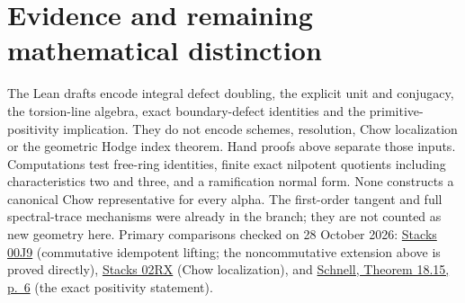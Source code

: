 \documentclass[11pt]{article}
\begin{document}
\section{Evidence and remaining mathematical distinction}
The Lean drafts encode integral defect doubling, the explicit unit and
conjugacy, the torsion-line algebra, exact boundary-defect identities and
the primitive-positivity implication. They do not encode schemes, resolution,
Chow localization or the geometric Hodge index theorem. Hand proofs above
separate those inputs. Computations test free-ring identities, finite exact
nilpotent quotients including characteristics two and three, and a ramification
normal form. None constructs a canonical Chow representative for every alpha.
The first-order tangent and full spectral-trace mechanisms were already in
the branch; they are not counted as new geometry here.
Primary comparisons checked on 28 October 2026:
\href{https://stacks.math.columbia.edu/tag/00J9}{Stacks 00J9}
(commutative idempotent lifting; the noncommutative extension above is proved
directly), \href{https://stacks.math.columbia.edu/tag/02RX}{Stacks 02RX}
(Chow localization), and
\href{https://www.math.stonybrook.edu/~cschnell/mat545/class18.pdf}{Schnell,
Theorem 18.15, p.~6} (the exact positivity statement).
\end{document}
